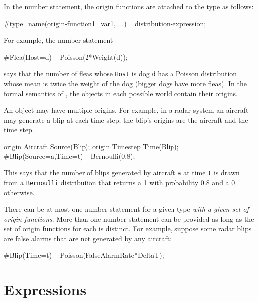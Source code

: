 \documentclass[12pt]{article}
\begin{document}
In the number statement, the origin functions are attached to the type 
as follows:
\begin{blogcode}
#type_name(origin-function1=var1, ...) ~ distribution-expression;
\end{blogcode}
For example, the number statement
\begin{blogcode}
#Flea(Host=d) ~ Poisson(2*Weight(d));
\end{blogcode}
says that the number of fleas whose {\tt Host} is dog {\tt d} has a Poisson distribution whose mean is twice the weight of the dog (bigger dogs have more fleas).
In the formal semantics of \bl, the objects in each possible world contain their origins.

An object may have multiple origins. For example, in a radar system an aircraft may generate a blip at each time step; the blip's origins are the aircraft and the time step.
\begin{blogcode}
origin Aircraft Source(Blip);
origin Timestep Time(Blip);
#Blip(Source=a,Time=t) ~ Bernoulli(0.8);
\end{blogcode}
This says that the number of blips generated by aircraft {\tt a} at time {\tt t} is drawn from
a \hyperref[builtin-distribution-appendix]{{\tt Bernoulli}} distribution that returns a 1 with probability 0.8 and a 0 otherwise.

There can be at most one number statement for a given type {\em with a given set of origin functions}. More than one number statement
can be provided as long as the set of origin functions for each is distinct. For example, suppose some radar blips are false alarms
that are not generated by any aircraft:
\begin{blogcode}
#Blip(Time=t) ~ Poisson(FalseAlarmRate*DeltaT);
\end{blogcode}

\section{Expressions}\label{expression-section}
\end{document}
